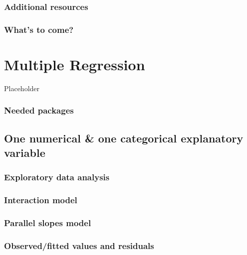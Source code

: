 \documentclass[
  12pt, krantz2,
]{krantz}
\begin{document}
\hypertarget{additional-resources-basic-regression}{%
\subsection{Additional resources}\label{additional-resources-basic-regression}}

\hypertarget{whats-to-come-4}{%
\subsection{What's to come?}\label{whats-to-come-4}}

\hypertarget{multiple-regression}{%
\chapter{Multiple Regression}\label{multiple-regression}}

Placeholder

\hypertarget{needed-packages-4}{%
\subsection*{Needed packages}\label{needed-packages-4}}


\hypertarget{model4}{%
\section{One numerical \& one categorical explanatory variable}\label{model4}}

\hypertarget{model4EDA}{%
\subsection{Exploratory data analysis}\label{model4EDA}}

\hypertarget{model4interactiontable}{%
\subsection{Interaction model}\label{model4interactiontable}}

\hypertarget{model4table}{%
\subsection{Parallel slopes model}\label{model4table}}

\hypertarget{model4points}{%
\subsection{Observed/fitted values and residuals}\label{model4points}}
\end{document}
